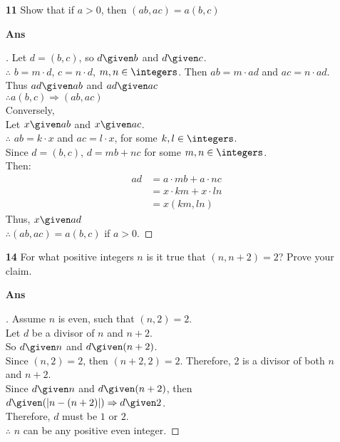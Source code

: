 \documentclass[paper=usletter, fontsize=12pt]{article}
\begin{document}
\begin{itemize}
\begin{itemize}
            \item[\textbf{11}] Show that if $a > 0$, then $(ab, ac) = a(b,
            c)$
            \item[\textbf{Ans}]
            \begin{proof}[\unskip\nopunct]
                Let $d = (b,c)$, so $d \given b$ and $d \given c$. \\
                $\therefore$ $b = m \cdot d$, $c = n \cdot d$, $m, n \in
                \integers$.
                Then $ab = m \cdot ad$ and $ac = n \cdot ad$. \\
                Thus $ad \given ab$ and $ad \given ac$ \\
                $\therefore a(b, c) \Rightarrow (ab, ac)$ \\
                Conversely, \\
                Let $x \given ab$ and $x \given ac$. \\
                $\therefore$ $ab = k \cdot x$ and $ac = l \cdot x$, for
                some $k, l \in \integers$. \\
                Since $d = (b,c)$, $d = mb + nc$ for some $m, n \in
                \integers$. \\
                Then:
                \begin{align*}
                    ad & = a \cdot mb + a \cdot nc \\
                    & = x \cdot km + x \cdot ln \\
                    & = x(km, ln)
                \end{align*}
                Thus, $x \given ad$ \\
                $\therefore (ab, ac) = a(b,c)$ if $a > 0$. \qedhere
            \end{proof}
            \vspace{0.2in}

            \item[\textbf{14}] For what positive integers $n$ is it true
            that $(n , n + 2) = 2$? Prove your claim.
            \item[\textbf{Ans}]
            \begin{proof}[\unskip\nopunct]
                Assume $n$ is even, such that $(n, 2) = 2$. \\
                Let $d$ be a divisor of $n$ and $n + 2$. \\
                So $d \given n$ and $d \given (n+2)$. \\
                Since $(n,2) = 2$, then $(n + 2, 2) = 2$. Therefore, 2 is a
                divisor of both $n$ and $n+2$. \\
                Since $d \given n$ and $d \given (n+2)$, then $d \given (|n -
                (n + 2)|) \Rightarrow d \given 2$. \\
                Therefore, $d$ must be $1$ or $2$. \\
                $\therefore$ $n$ can be any positive even integer. \qedhere
            \end{proof}
            \vspace{0.2in}


\end{itemize}
\end{itemize}
\end{document}
